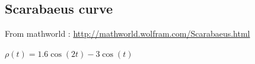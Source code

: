 \newpage
\subsection{Scarabaeus curve}
From mathworld : \url{http://mathworld.wolfram.com/Scarabaeus.html}

$\rho(t)=1.6\cos(2t)-3\cos(t) $

\begin{center}
\begin{tkzexample}[]
\end{tkzexample}
\end{center}

\endinput
